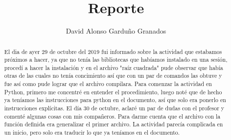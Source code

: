 \documentclass[]{article}
\title{Reporte}
\author{David Alonso Garduño Granados}
\begin{document}
\maketitle

\begin{abstract}
El dia de ayer 29 de octubre del 2019 fui informado sobre la actividad que estabamos próximos a hacer, ya que no tenía las bibliotecas que habíamos instalado en una sesión, procedí a hacer la instalación y en el archivo "raíz cuadrada" pude observar que había otras de las cuales no tenía concimiento así que con un par de comandos las obtuve y fue así como pude lograr que el archivo compilara.
Para comenzar la actividad en Python, primero me concentré en entender el procedimiento, luego noté que de hecho ya teníamos las instrucciones para python en el documento, así que solo era ponerlo en instrucciones explícitas.
El día 30 de octubre, aclaré un par de dudas con el profesor y comenté algunas cosas con mis compañeros. Para darme cuenta que el archivo con la función definida era generalizar el primer archivo.
La actividad parecía complicada en un inicio, pero solo era traducir lo que ya teníamos en el documento.
\end{abstract}
\end{document}
